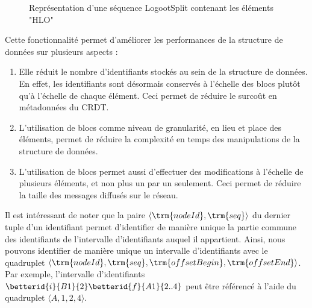 \begin{figure}[!ht]
  \centering
  \hfil
  \caption{Représentation d'une séquence LogootSplit contenant les éléments "HLO"}
  \label{fig:logootsplit-seq}
\end{figure}

Cette fonctionnalité permet d'améliorer les performances de la structure de données sur plusieurs aspects :
\begin{enumerate}
  \item Elle réduit le nombre d'identifiants stockés au sein de la structure de données.
    En effet, les identifiants sont désormais conservés à l'échelle des blocs plutôt qu'à l'échelle de chaque élément.
    Ceci permet de réduire le surcoût en métadonnées du \ac{CRDT}.
  \item L'utilisation de blocs comme niveau de granularité, en lieu et place des éléments, permet de réduire la complexité en temps des manipulations de la structure de données.
  \item L'utilisation de blocs permet aussi d'effectuer des modifications à l'échelle de plusieurs éléments, et non plus un par un seulement.
    Ceci permet de réduire la taille des messages diffusés sur le réseau.
\end{enumerate}

Il est intéressant de noter que la paire $\langle \trm{nodeId},\trm{seq} \rangle$ du dernier tuple d'un identifiant permet d'identifier de manière unique la partie commune des identifiants de l'intervalle d'identifiants auquel il appartient.
Ainsi, nous pouvons identifier de manière unique un intervalle d'identifiants avec le quadruplet $\langle \trm{nodeId}, \trm{seq}, \trm{offsetBegin}, \trm{offsetEnd} \rangle$.
Par exemple, l'intervalle d'identifiants $\betterid{i}{B1}{2}\betterid{f}{A1}{2..4}$ peut être référencé à l'aide du quadruplet $\langle A,1,2,4 \rangle$.
